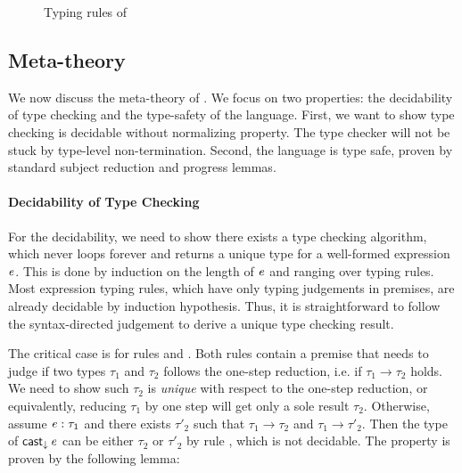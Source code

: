 \begin{figure}
    \ottdefnctx{}\ottinterrule
    \ottdefnexpr{}
    \caption{Typing rules of \ecore}
    \label{fig:ecore:typing}
\end{figure}

\subsection{Meta-theory}\label{sec:ecore:meta}
We now discuss the meta-theory of \ecore. We focus on two properties: the
decidability of type checking and the type-safety of the language. First, we
want to show type checking \ecore is decidable without normalizing property.
The type checker will not be stuck by type-level non-termination. Second, the
language is type safe, proven by standard subject reduction and progress
lemmas.

\paragraph{Decidability of Type Checking}
For the decidability, we need to show there exists a type checking algorithm,
which never loops forever and returns a unique type for a well-formed
expression $\mathit{e}$. This is done by induction on the length of $\mathit{e}$ and
ranging over typing rules. Most expression typing rules, which have only typing
judgements in premises, are already decidable by induction hypothesis. Thus, it
is straightforward to follow the syntax-directed judgement to derive a unique
type checking result.

The critical case is for rules  and .
Both rules contain a premise that needs to judge if two types $\tau_{{\mathrm{1}}}$ and
$\tau_{{\mathrm{2}}}$ follows the one-step reduction, i.e. if $\tau_{{\mathrm{1}}}  \longrightarrow  \tau_{{\mathrm{2}}}$ holds. We need
to show such $\tau_{{\mathrm{2}}}$ is \emph{unique} with respect to the one-step reduction,
or equivalently, reducing $\tau_{{\mathrm{1}}}$ by one step will get only a sole result
$\tau_{{\mathrm{2}}}$. Otherwise, assume $\mathit{e}:\tau_{{\mathrm{1}}}$ and there exists $\tau'_{{\mathrm{2}}}$ such that
$\tau_{{\mathrm{1}}}  \longrightarrow  \tau_{{\mathrm{2}}}$ and $\tau_{{\mathrm{1}}}  \longrightarrow  \tau'_{{\mathrm{2}}}$. Then the type of $\mathsf{cast}_{\downarrow} \, \mathit{e}$ can be
either $\tau_{{\mathrm{2}}}$ or $\tau'_{{\mathrm{2}}}$ by rule , which is not
decidable. The property is proven by the following lemma:

